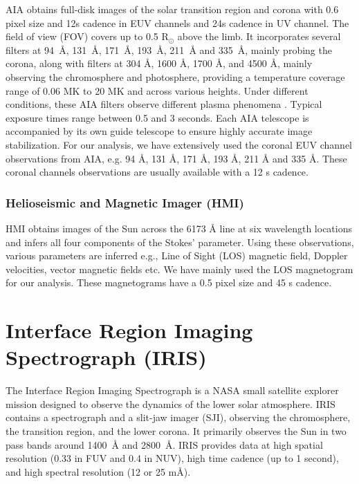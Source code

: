 AIA \citep{aia} obtains full-disk images of the solar transition region and corona with 0.6{\arcsec} pixel size and 12s cadence in EUV channels and 24s cadence in UV channel. The field of view (FOV) covers up to 0.5 $\mathrm{R_{\odot}}$ above the limb. It incorporates several filters at 94~{\AA}, 131~{\AA}, 171~{\AA}, 193~{\AA}, 211~{\AA} and 335~{\AA}, mainly probing the corona, along with filters at 304 {\AA}, 1600 {\AA}, 1700 {\AA}, and 4500 {\AA}, mainly observing the chromosphere and photosphere, providing a temperature coverage range of 0.06 MK to 20 MK and across various heights. Under different conditions, these AIA filters observe different plasma phenomena \citep{o'dwyer10}. Typical exposure times range between 0.5 and 3 seconds. Each AIA telescope is accompanied by its own guide telescope to ensure highly accurate image stabilization. For our analysis, we have extensively used the coronal EUV channel observations from AIA, e.g. 94 {\AA}, 131 {\AA}, 171 {\AA}, 193 {\AA}, 211 {\AA} and 335 {\AA}. These coronal channels observations are usually available with a 12 s cadence.

\subsubsection{Helioseismic and Magnetic Imager (HMI)}

HMI \citep{hmi} obtains images of the Sun across the  6173 {\AA} line at six wavelength locations and infers all four components of the Stokes' parameter. Using these observations, various parameters are inferred e.g., Line of Sight (LOS) magnetic field, Doppler velocities, vector magnetic fields etc. We have mainly used the LOS magnetogram for our analysis. These magnetograms have a 0.5{\arcsec} pixel size and {45} s cadence.

\section{Interface Region Imaging Spectrograph (IRIS)}

The Interface Region Imaging Spectrograph \citep[IRIS;][]{iris} is a NASA small satellite explorer mission designed to observe the dynamics of the lower solar atmosphere. IRIS contains a spectrograph and a slit-jaw imager (SJI), observing the chromosphere, the transition region, and the lower corona. It primarily observes the Sun in two pass bands around 1400~{\AA} and 2800~{\AA}. IRIS provides data at high spatial resolution (0.33 {\arcsec} in FUV and 0.4 {\arcsec} in NUV), high time cadence (up to 1 second), and high spectral resolution (12 or 25 m{\AA}). 

